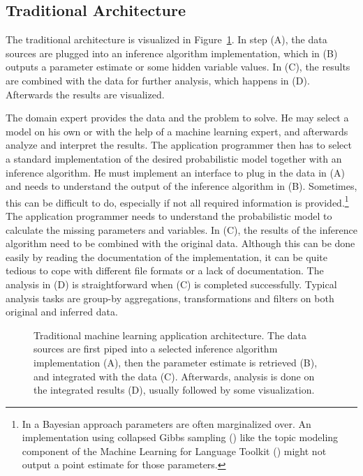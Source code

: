 \subsection{Traditional Architecture}

The traditional architecture is visualized in Figure~\ref{fig:ml-application-architecture}. In step (A), the data sources are plugged into an inference algorithm implementation, which in (B) outputs a parameter estimate or some hidden variable values. In (C), the results are combined with the data for further analysis, which happens in (D). Afterwards the results are visualized.

The domain expert provides the data and the problem to solve. He may select a model on his own or with the help of a machine learning expert, and afterwards analyze and interpret the results. The application programmer then has to select a standard implementation of the desired probabilistic model together with an inference algorithm. He must implement an interface to plug in the data in (A) and needs to understand the output of the inference algorithm in (B). Sometimes, this can be difficult to do, especially if not all required information is provided.\footnote{In a Bayesian approach parameters are often marginalized over. An implementation using collapsed Gibbs sampling (\cite{liu1994collapsed}) like the topic modeling component of the Machine Learning for Language Toolkit (\cite{mccallum2002mallet}) might not output a point estimate for those parameters.} The application programmer needs to understand the probabilistic model to calculate the missing parameters and variables. In (C), the results of the inference algorithm need to be combined with the original data. Although this can be done easily by reading the documentation of the implementation, it can be quite tedious to cope with different file formats or a lack of documentation. The analysis in (D) is straightforward when (C) is completed successfully. Typical analysis tasks are group-by aggregations, transformations and filters on both original and inferred data.

\begin{figure}[t]
\centering
\scalebox{\tikzScale}{\adjustTikzSize }
\caption[Traditional machine learning application architecture]{Traditional machine learning application architecture. The data sources are first piped into a selected inference algorithm implementation (A), then the parameter estimate is retrieved (B), and integrated with the data (C). Afterwards, analysis is done on the integrated results (D), usually followed by some visualization.}\label{fig:ml-application-architecture}
\end{figure}

